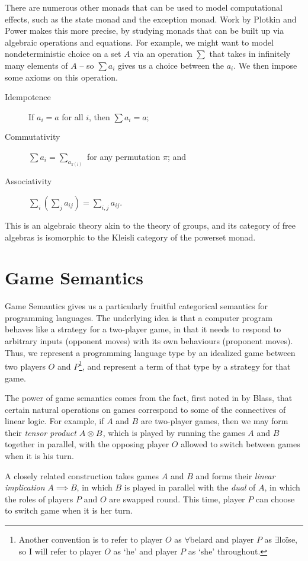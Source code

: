 There are numerous other monads that can be used to model computational effects, such as the state monad and the exception monad.  
Work by Plotkin and Power \cite{PlotkinPower} makes this more precise, by studying monads that can be built up via algebraic operations and equations.  
For example, we might want to model nondeterministic choice on a set $A$ via an operation $\sum$ that takes in infinitely many elements of $A$ -- so $\sum a_i$ gives us a choice between the $a_i$.  
We then impose some axioms on this operation.
\begin{description}
  \item[Idempotence] If $a_i=a$ for all $i$, then $\sum a_i=a$;
  \item[Commutativity] $\sum a_i = \sum_{a_{\pi(i)}}$ for any permutation $\pi$; and
  \item[Associativity] $\sum_i (\sum_j a_{ij}) = \sum_{i,j} a_{ij}$.
\end{description}
This is an algebraic theory akin to the theory of groups, and its category of free algebras is isomorphic to the Kleisli category of the powerset monad.

\section{Game Semantics}

Game Semantics gives us a particularly fruitful categorical semantics for programming languages.  
The underlying idea is that a computer program behaves like a strategy for a two-player game, in that it needs to respond to arbitrary inputs (opponent moves) with its own behaviours (proponent moves).  
Thus, we represent a programming language type by an idealized game between two players $O$ and $P$\footnote{Another convention is to refer to player $O$ as $\forall{}$belard and player $P$ as $\exists{}$lo\"{i}se, so I will refer to player $O$ as `he' and player $P$ as `she' throughout.}, and represent a term of that type by a strategy for that game.

The power of game semantics comes from the fact, first noted in \cite{blassgames} by Blass, that certain natural operations on games correspond to some of the connectives of linear logic.  
For example, if $A$ and $B$ are two-player games, then we may form their \emph{tensor product} $A\otimes B$, which is played by running the games $A$ and $B$ together in parallel, with the opposing player $O$ allowed to switch between games when it is his turn.

A closely related construction takes games $A$ and $B$ and forms their \emph{linear implication} $A\implies B$, in which $B$ is played in parallel with the \emph{dual} of $A$, in which the roles of players $P$ and $O$ are swapped round.  
This time, player $P$ can choose to switch game when it is her turn.

